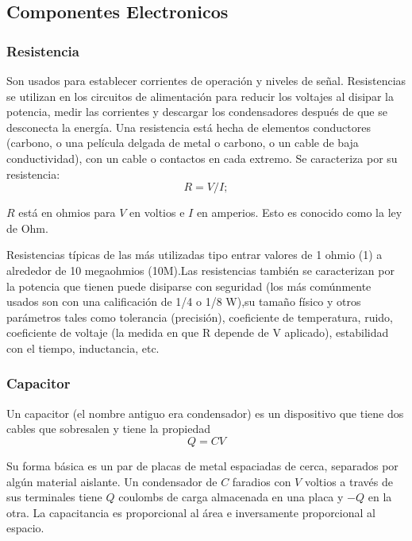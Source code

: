 \subsection{Componentes Electronicos}
	\subsubsection{Resistencia} 
		\par 
			Son usados para establecer corrientes de operación y niveles de señal. Resistencias se utilizan en los circuitos de alimentación para reducir los voltajes al disipar la potencia, medir las corrientes y descargar los condensadores después de que se desconecta la energía. Una resistencia está hecha de elementos conductores (carbono, o una película delgada de metal o carbono, o un cable de baja conductividad), con un cable o contactos en cada extremo. Se caracteriza por su resistencia:
			$$R = V/I;$$
		
		\par \noindent
			$R$ está en ohmios para $V$ en voltios e $I$ en amperios. Esto es conocido
			como la ley de Ohm.
		
		\par \noindent
			Resistencias típicas de las más utilizadas
			tipo entrar valores de 1 ohmio (1) a alrededor de 10 megaohmios (10M).Las resistencias también se caracterizan por la potencia que tienen puede disiparse con seguridad (los más comúnmente usados son con una calificación de 1/4 o 1/8 W),su tamaño físico y otros parámetros tales como tolerancia (precisión), coeficiente de temperatura, ruido, coeficiente de voltaje (la medida en que R depende de V aplicado), estabilidad con el tiempo, inductancia, etc.
		
	\subsubsection{Capacitor}
		\par 
			Un capacitor (el nombre antiguo era
			condensador) es un dispositivo que tiene dos cables que sobresalen y tiene la propiedad
			$$Q = CV$$ 
			
		\par \noindent
			Su forma básica es un par de placas de metal espaciadas de cerca, separados por algún material aislante. Un condensador de $C$ faradios con $V$ voltios a través de sus terminales tiene $Q$ coulombs de carga almacenada en una placa y $-Q$ en la otra. La capacitancia es proporcional al área e inversamente proporcional al espacio.
		
